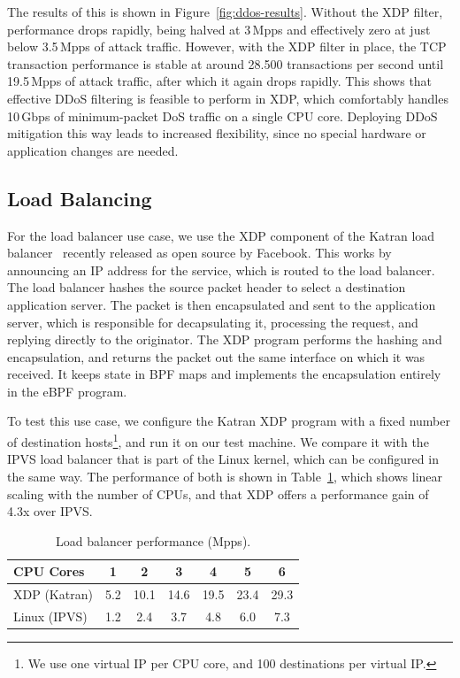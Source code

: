 \documentclass[sigconf]{acmart}
\begin{document}
The results of this is shown in Figure~\ref{fig:ddos-results}. Without the XDP
filter, performance drops rapidly, being halved at 3\,Mpps and effectively zero
at just below 3.5\,Mpps of attack traffic. However, with the XDP filter in
place, the TCP transaction performance is stable at around 28.500 transactions
per second until 19.5\,Mpps of attack traffic, after which it again drops
rapidly. This shows that effective DDoS filtering is feasible to perform in XDP,
which comfortably handles 10\,Gbps of minimum-packet DoS traffic on a single CPU
core. Deploying DDoS mitigation this way leads to increased flexibility, since
no special hardware or application changes are needed.

\subsection{Load Balancing}
\label{sec:load-balancer}
For the load balancer use case, we use the XDP component of the Katran load
balancer~\cite{katran} recently released as open source by Facebook. This works
by announcing an IP address for the service, which is routed to the load
balancer. The load balancer hashes the source packet header to select a
destination application server. The packet is then encapsulated and sent to the
application server, which is responsible for decapsulating it, processing the
request, and replying directly to the originator. The XDP program performs the
hashing and encapsulation, and returns the packet out the same interface on
which it was received. It keeps state in BPF maps and implements the
encapsulation entirely in the eBPF program.

To test this use case, we configure the Katran XDP program with a fixed number
of destination hosts\footnote{We use one virtual IP per CPU core, and 100
  destinations per virtual IP.}, and run it on our test machine. We compare it
with the IPVS load balancer that is part of the Linux kernel, which can be
configured in the same way. The performance of both is shown in
Table~\ref{tbl:load-balancer}, which shows linear scaling with the number of
CPUs, and that XDP offers a performance gain of 4.3x over IPVS.

\begin{table}[tbp]
\caption{\label{tbl:load-balancer}Load balancer performance (Mpps).}
\centering
\begin{tabular}{lcccccc}
  \toprule
  CPU Cores & 1   &  2  &  3  &  4  &  5  &  6  \\
  \midrule
  XDP (Katran) & 5.2 & 10.1 & 14.6 & 19.5 & 23.4 & 29.3 \\
  Linux (IPVS) & 1.2 & 2.4 & 3.7 & 4.8 & 6.0 & 7.3 \\
\bottomrule
\end{tabular}
\end{table}
\end{document}
